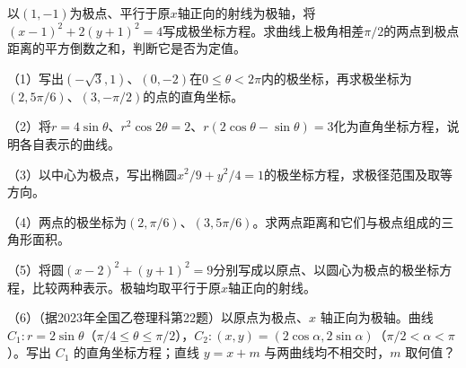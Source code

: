 \par\addvspace{6pt}\noindent\begin{minipage}{\linewidth}
\begin{example}
以\((1,-1)\)为极点、平行于原\(x\)轴正向的射线为极轴，将\((x-1)^2+2(y+1)^2=4\)写成极坐标方程。求曲线上极角相差\(\pi/2\)的两点到极点距离的平方倒数之和，判断它是否为定值。
\end{example}
\end{minipage}\par\addvspace{6pt}

\begin{exercise}
\mbox{}\par\nobreak
\begin{samepage}
（1）写出\((-\sqrt3,1)\)、\((0,-2)\)在\(0\le\theta<2\pi\)内的极坐标，再求极坐标为\((2,5\pi/6)\)、\((3,-\pi/2)\)的点的直角坐标。
\par\end{samepage}
\begin{samepage}
（2）将\(r=4\sin\theta\)、\(r^2\cos2\theta=2\)、\(r(2\cos\theta-\sin\theta)=3\)化为直角坐标方程，说明各自表示的曲线。
\par\end{samepage}
\begin{samepage}
（3）以中心为极点，写出椭圆\(x^2/9+y^2/4=1\)的极坐标方程，求极径范围及取等方向。
\par\end{samepage}
\begin{samepage}
（4）两点的极坐标为\((2,\pi/6)\)、\((3,5\pi/6)\)。求两点距离和它们与极点组成的三角形面积。
\par\end{samepage}
\begin{samepage}
（5）将圆\((x-2)^2+(y+1)^2=9\)分别写成以原点、以圆心为极点的极坐标方程，比较两种表示。极轴均取平行于原\(x\)轴正向的射线。
\par\end{samepage}
\begin{samepage}
（6）（据2023年全国乙卷理科第22题）以原点为极点、\(x\) 轴正向为极轴。曲线 \(C_1:r=2\sin\theta\)（\(\pi/4\le\theta\le\pi/2\)），\(C_2:(x,y)=(2\cos\alpha,2\sin\alpha)\)（\(\pi/2<\alpha<\pi\)）。写出 \(C_1\) 的直角坐标方程；直线 \(y=x+m\) 与两曲线均不相交时，\(m\) 取何值？
\par\end{samepage}


\end{exercise}
